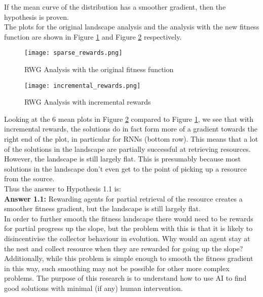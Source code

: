 \documentclass[12pt]{article}
\begin{document}
If the mean curve of the distribution has a smoother gradient, then the hypothesis is proven.\\

The plots for the original landscape analysis and the analysis with the new fitness function are shown in Figure \ref{fig:sparse} and Figure \ref{fig:incremental} respectively.\\

\begin{figure}[h]
\centering
\texttt{[image: sparse\_rewards.png]}
\caption{RWG Analysis with the original fitness function}
\label{fig:sparse}
\end{figure}

\begin{figure}[h]
\centering
\texttt{[image: incremental\_rewards.png]}
\caption{RWG Analysis with incremental rewards}
\label{fig:incremental}
\end{figure}

Looking at the 6 mean plots in Figure \ref{fig:incremental} compared to Figure \ref{fig:sparse}, we see that with incremental rewards, the solutions do in fact form more of a gradient towards the right end of the plot, in particular for RNNs (bottom row). 
This means that a lot of the solutions in the landscape are partially successful at retrieving resources. 
However, the landscape is still largely flat. 
This is presumably because most solutions in the landscape don't even get to the point of picking up a resource from the source.\\ 

Thus the answer to Hypothesis 1.1 is:\\

\textbf{Answer 1.1:} Rewarding agents for partial retrieval of the resource creates a smoother fitness gradient, but the landscape is still largely flat.\\

In order to further smooth the fitness landscape there would need to be rewards for partial progress up the slope, but the problem with this is that it is likely to disincentivise the collector behaviour in evolution.
Why would an agent stay at the nest and collect resource when they are rewarded for going up the slope? 
Additionally, while this problem is simple enough to smooth the fitness gradient in this way, such smoothing may not be possible for other more complex problems.
The purpose of this research is to understand how to use AI to find good solutions with minimal (if any) human intervention.\\
\end{document}
